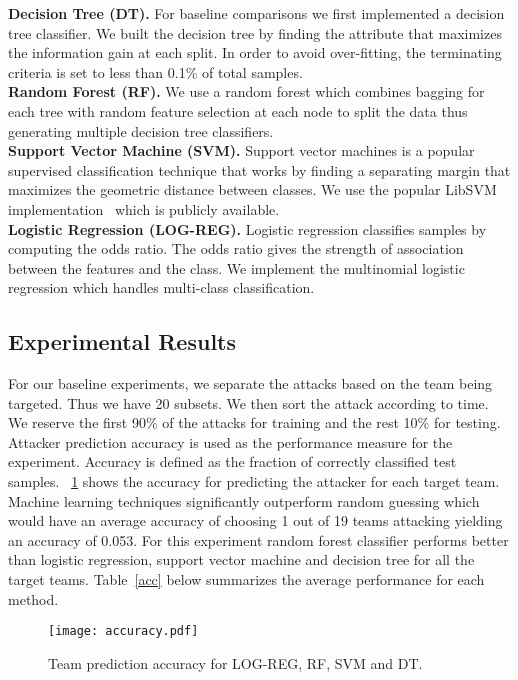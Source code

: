 \documentclass[conference]{IEEEtran}
\begin{document}
\noindent\textbf{Decision Tree (DT).}  For baseline comparisons we first implemented a decision tree classifier. We built the decision tree by finding the attribute that maximizes the information gain at each split. In order to avoid over-fitting, the terminating criteria is set to less than 0.1\% of total samples.\smallskip \\
\noindent\textbf{Random Forest (RF).}  We use a random forest which combines bagging for each tree with random feature selection at each node to split the data thus generating multiple decision tree classifiers. \smallskip\\
\noindent\textbf{Support Vector Machine (SVM).}  Support vector machines is a popular supervised classification technique that works by finding a separating margin that maximizes the geometric distance between classes. We use the popular LibSVM implementation~\cite{Chang2011} which is publicly available. \smallskip \\
\noindent\textbf{Logistic Regression (LOG-REG).}  Logistic regression classifies samples by computing the odds ratio. The odds ratio gives the strength of association between the features and the class. We implement the multinomial logistic regression which handles multi-class classification.



\subsection{Experimental Results}
\label{results}
For our baseline experiments, we separate the attacks based on the team being targeted. Thus we have 20 subsets. We then sort the attack according to time. We reserve the first 90\% of the attacks for training and the rest 10\% for testing. Attacker prediction accuracy is used as the performance measure for the experiment. Accuracy is defined as the fraction of correctly classified test samples. \figurename~\ref{fig:three} shows the accuracy for predicting the attacker for each target team. Machine learning techniques significantly outperform random guessing which would have an average accuracy of choosing 1 out of 19 teams attacking yielding an accuracy of 0.053. For this experiment random  forest classifier performs better than logistic regression, support vector machine and decision tree for all the target teams. Table~\ref{acc} below summarizes the average performance for each method.

\begin{figure}[htp!]
	\centerline{\texttt{[image: accuracy.pdf]}}
	\captionsetup{justification=centering}
	\caption{\textmd{Team prediction accuracy for LOG-REG, RF, SVM and DT.}}
\label{fig:three}
\end{figure}
\end{document}
